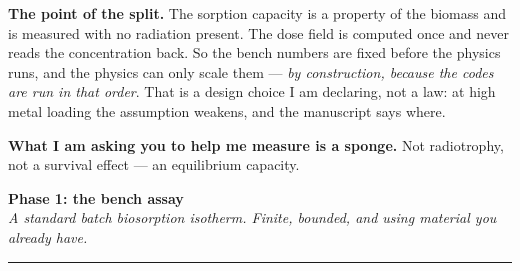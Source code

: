 \documentclass[landscape,12pt]{article}
\newcommand{\pagehead}[2]{%
  {\Large\bfseries #1}\\[1pt]
  {\small\itshape #2}\\[-4pt]
  \rule{\linewidth}{0.6pt}\\[4pt]}
\begin{document}
\begin{center}
{}
\end{center}

\vspace{-1mm}
{\small
\textbf{The point of the split.} The sorption capacity is a property of the biomass and is
measured with no radiation present. The dose field is computed once and never reads the
concentration back. So the bench numbers are fixed before the physics runs, and the physics
can only scale them --- \emph{by construction, because the codes are run in that order}. That
is a design choice I am declaring, not a law: at high metal loading the assumption weakens,
and the manuscript says where.

\textbf{What I am asking you to help me measure is a sponge.} Not radiotrophy, not a survival
effect --- an equilibrium capacity.}

\newpage
\pagehead{Phase 1: the bench assay}%
{A standard batch biosorption isotherm. Finite, bounded, and using material you already have.}
\end{document}

